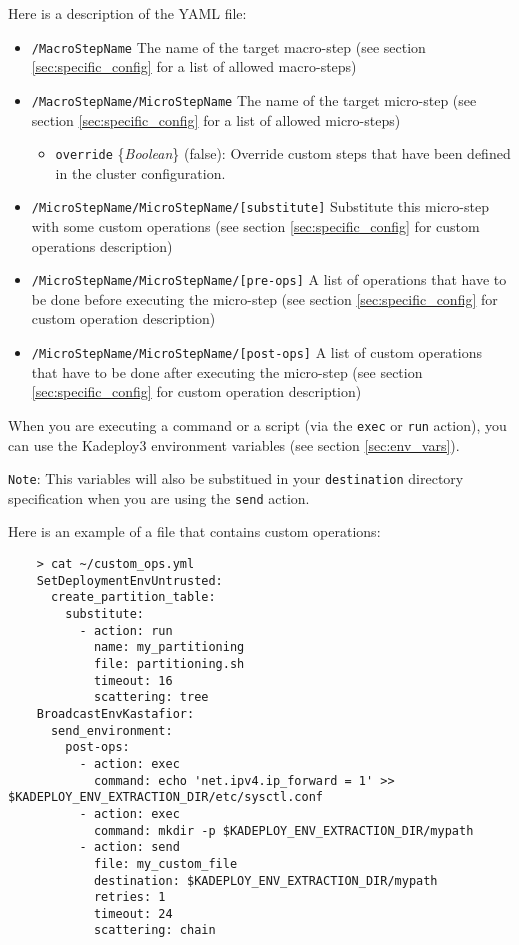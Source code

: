 \documentclass[a4wide,10pt,oneside]{book}
\newcommand{\ypath}[1]{\texttt{#1}}
\newcommand{\yfieldd}[3]{\texttt{#1} {\small\{{\emph{#2}}\}} {\small(}#3{\small)}:}
\begin{document}
Here is a description of the YAML file:
\begin{itemize}
  \item \ypath{/MacroStepName} The name of the target macro-step (see section \ref{sec:specific_config} for a list of allowed macro-steps)
  \item \ypath{/MacroStepName/MicroStepName} The name of the target micro-step (see section \ref{sec:specific_config} for a list of allowed micro-steps)
  \begin{itemize}
    \item \yfieldd{override}{Boolean}{false} Override custom steps that have been defined in the cluster configuration.
  \end{itemize}
  \item \ypath{/MicroStepName/MicroStepName/[substitute]} Substitute this micro-step with some custom operations (see section \ref{sec:specific_config} for custom operations description)
  \item \ypath{/MicroStepName/MicroStepName/[pre-ops]} A list of operations that have to be done before executing the micro-step (see section \ref{sec:specific_config} for custom operation description)
  \item \ypath{/MicroStepName/MicroStepName/[post-ops]} A list of custom operations that have to be done after executing the micro-step (see section \ref{sec:specific_config} for custom operation description)
\end{itemize}

When you are executing a command or a script (via the \texttt{exec} or \texttt{run} action), you can use the Kadeploy3 environment variables (see section \ref{sec:env_vars}).

\texttt{Note}: This variables will also be substitued in your \texttt{destination} directory specification when you are using the \texttt{send} action.

Here is an example of a file that contains custom operations:
\begin{small}
\begin{verbatim}
    > cat ~/custom_ops.yml
    SetDeploymentEnvUntrusted:
      create_partition_table:
        substitute:
          - action: run
            name: my_partitioning
            file: partitioning.sh
            timeout: 16
            scattering: tree
    BroadcastEnvKastafior:
      send_environment:
        post-ops:
          - action: exec
            command: echo 'net.ipv4.ip_forward = 1' >> $KADEPLOY_ENV_EXTRACTION_DIR/etc/sysctl.conf
          - action: exec
            command: mkdir -p $KADEPLOY_ENV_EXTRACTION_DIR/mypath
          - action: send
            file: my_custom_file
            destination: $KADEPLOY_ENV_EXTRACTION_DIR/mypath
            retries: 1
            timeout: 24
            scattering: chain
\end{verbatim}
\end{small}
\end{document}
